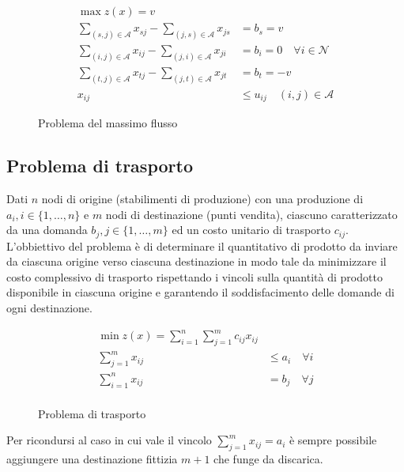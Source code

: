 \documentclass[\main/main.tex]{subfiles}
\begin{document}
\begin{figure}
	\begin{align*}
		\max z(x) = v                                                                                                         \\
		\sum_{(s,j) \in \mathcal{A}} x_{sj} - \sum_{(j,s) \in \mathcal{A}} x_{js} & = b_s =v                                  \\
		\sum_{(i,j) \in \mathcal{A}} x_{ij} - \sum_{(j,i) \in \mathcal{A}} x_{ji} & = b_i = 0 \quad \forall i \in \mathcal{N} \\
		\sum_{(t,j) \in \mathcal{A}} x_{tj} - \sum_{(j,t) \in \mathcal{A}} x_{jt} & = b_t = -v                                \\
		x_{ij}                                                                    & \leq u_{ij} \quad (i,j) \in \mathcal{A}
	\end{align*}
	\caption{Problema del massimo flusso}
\end{figure}

\subsection{Problema di trasporto}
Dati $n$ nodi di origine (stabilimenti di produzione) con una produzione di $a_i, i \in \{1, \ldots, n\}$ e $m$ nodi di destinazione (punti vendita), ciascuno caratterizzato da una domanda $b_j, j \in \{1, \ldots, m\}$ ed un costo unitario di trasporto $c_{ij}$. L'obbiettivo del problema è di determinare il quantitativo di prodotto da inviare da ciascuna origine verso ciascuna destinazione in modo tale da minimizzare il costo complessivo di trasporto rispettando i vincoli sulla quantità di prodotto disponibile in ciascuna origine e garantendo il soddisfacimento delle domande di ogni destinazione.

\begin{figure}
	\begin{align*}
		\min z(x) = \sum_{i=1}^n\sum_{j=1}^m c_{ij}x_{ij} \\
		\sum_{j=1}^m x_{ij} & \leq a_i \quad \forall i    \\
		\sum_{i=1}^n x_{ij} & = b_j  \quad \forall j      \\
	\end{align*}
	\caption{Problema di trasporto}
\end{figure}

Per ricondursi al caso in cui vale il vincolo $\sum_{j=1}^m x_{ij} = a_i$ è sempre possibile aggiungere una destinazione fittizia $m+1$ che funge da discarica.
\end{document}
